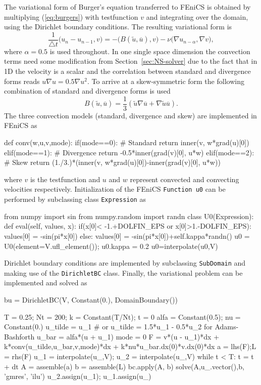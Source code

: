 The variational form of Burger's equation transferred to FEniCS is obtained by multiplying (\ref{eq:burgers}) with testfunction $v$ and integrating over the domain, using the Dirichlet boundary conditions. The resulting variational form is
\begin{equation}
 \frac{1}{\triangle t}\bigl( u_{n} - u_{n-1} , v\bigr) = - \bigl(B(\tilde{u},\overline{u}), v \bigr) - \nu \bigl( \nabla u_{n-\alpha}, \nabla v \bigr),
\label{eq:burgers_vf}
\end{equation}
where $\alpha=0.5$ is used throughout. In one single space dimension the convection terms need some modification from Section~\ref{sec:NS-solver} due to the fact that in 1D the velocity is a scalar and the correlation between standard and divergence forms reads $u\nabla u =0.5 \nabla u^2$. To arrive at a skew-symmetric form the following combination of standard and divergence forms is used
\begin{equation}
 B(\tilde{u},\overline{u}) = \frac{1}{3}\left( \tilde{u}\nabla \overline{u} + \nabla \tilde{u} \overline{u} \right).
\end{equation}
The three convection models (standard, divergence and skew) are implemented in FEniCS as
\begin{fenicscode}{0.9}
def conv(w,u,v,mode):
    if(mode==0): # Standard
        return inner(v, w*grad(u)[0])
    elif(mode==1): # Divergence
        return -0.5*inner(grad(v)[0], u*w)
    elif(mode==2): # Skew
        return (1./3.)*(inner(v, w*grad(u)[0])-inner(grad(v)[0], u*w))
\end{fenicscode}
where $v$ is the testfunction and $u$ and $w$ represent convected and
convecting velocities respectively. Initialization of the FEniCS
{\fontsize{12pt}{12pt}\texttt{Function u0}} can be performed by subclassing  class
{\fontsize{12pt}{12pt}\texttt{Expression}} as
\begin{fenicscode}{0.9}
from numpy import sin
from numpy.random import randn
class U0(Expression):
    def eval(self, values, x):
        if(x[0]< -1.+DOLFIN_EPS or x[0]>1.-DOLFIN_EPS):
            values[0] = -sin(pi*x[0])
        else:
            values[0] = -sin(pi*x[0])+self.kappa*randn()
u0 = U0(element=V.ufl_element()); u0.kappa = 0.2
u0=interpolate(u0,V)
\end{fenicscode}
Dirichlet boundary conditions are implemented by subclassing {\fontsize{12pt}{12pt}\texttt{SubDomain}} and making use of the {\fontsize{12pt}{12pt}\texttt{DirichletBC}} class. Finally, the variational problem can be implemented and solved as
\begin{fenicscode}{0.9}
bu = DirichletBC(V, Constant(0.), DomainBoundary())

T = 0.25; Nt = 200; k = Constant(T/Nt); t = 0
alfa = Constant(0.5); nu = Constant(0.)
u_tilde = u_1 # or u_tilde = 1.5*u_1 - 0.5*u_2 for Adams-Bashforth
u_bar = alfa*(u + u_1)
mode = 0
F = v*(u - u_1)*dx + k*conv(u_tilde,u_bar,v,mode)*dx + k*nu*u_bar.dx(0)*v.dx(0)*dx
a = lhs(F);L = rhs(F)
u_1 = interpolate(u_,V); u_2 = interpolate(u_,V)
while t < T:
    t = t + dt
    A = assemble(a)
    b = assemble(L)
    bc.apply(A, b)
    solve(A,u_.vector(),b, 'gmres', 'ilu')
    u_2.assign(u_1); u_1.assign(u_)
\end{fenicscode}


